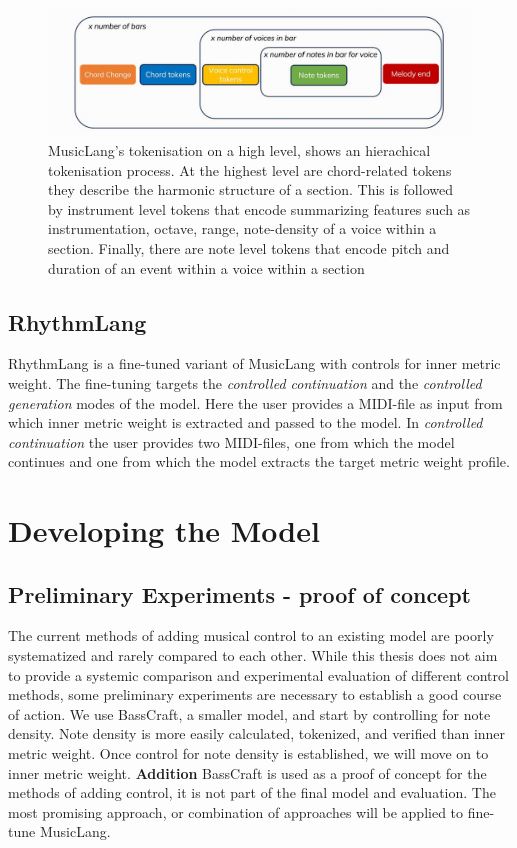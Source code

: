 \begin{figure}[H]
    \centering
    \includegraphics[width=1\textwidth]{IMAGES/MusicLang.JPG} 
    \caption{MusicLang's tokenisation on a high level, shows an hierachical tokenisation process. At the highest level are chord-related tokens they describe the harmonic structure of a section. This is followed by instrument level tokens that encode summarizing features such as instrumentation, octave, range, note-density of a voice within a section. Finally, there are note level tokens that encode pitch and duration of an event within a voice within a section}
    \label{fig:musiclangtok}
\end{figure}

\subsection{RhythmLang}
RhythmLang is a fine-tuned variant of MusicLang with controls for inner metric weight. The fine-tuning targets the \textit{controlled continuation} and the \textit{controlled generation} modes of the model. Here the user provides a MIDI-file as input from which inner metric weight is extracted and passed to the model. In \textit{controlled continuation} the user provides two MIDI-files, one from which the model continues and one from which the model extracts the target metric weight profile. 

\section{Developing the Model}

\subsection{Preliminary Experiments - proof of concept}
The current methods of adding musical control to an existing model are poorly systematized and rarely compared to each other. While this thesis does not aim to provide a systemic comparison and experimental evaluation of different control methods, some preliminary experiments are necessary to establish a good course of action. We use BassCraft, a smaller model, and start by controlling for note density. Note density is more easily calculated, tokenized, and verified than inner metric weight. Once control for note density is established, we will move on to inner metric weight. \textbf{Addition} BassCraft is used as a proof of concept for the methods of adding control, it is not part of the final model and evaluation. The most promising approach, or combination of approaches will be applied to fine-tune MusicLang. 

